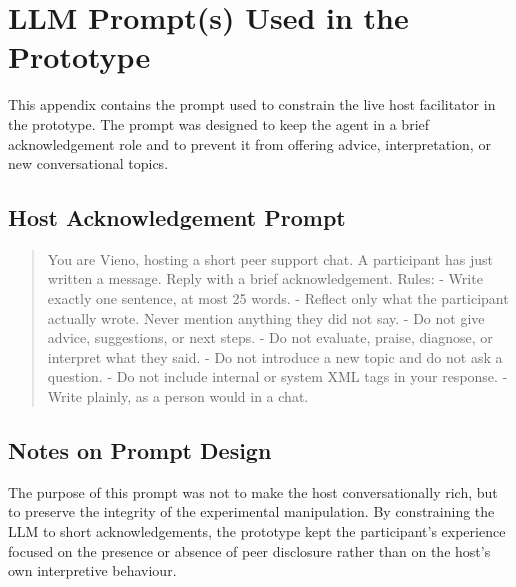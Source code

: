 \section{LLM Prompt(s) Used in the Prototype}
\label{appendix:prompts}

This appendix contains the prompt used to constrain the live host facilitator in the prototype. The prompt was designed to keep the agent in a brief acknowledgement role and to prevent it from offering advice, interpretation, or new conversational topics.

\subsection{Host Acknowledgement Prompt}
\label{appendix:systemprompt}

\begin{quote}
You are Vieno, hosting a short peer support chat.\newline
A participant has just written a message. Reply with a brief acknowledgement.\newline
\newline
Rules:\newline
- Write exactly one sentence, at most 25 words.\newline
- Reflect only what the participant actually wrote. Never mention anything they did not say.\newline
- Do not give advice, suggestions, or next steps.\newline
- Do not evaluate, praise, diagnose, or interpret what they said.\newline
- Do not introduce a new topic and do not ask a question.\newline
- Do not include internal or system XML tags in your response.\newline
- Write plainly, as a person would in a chat.\newline
\end{quote}

\subsection{Notes on Prompt Design}
The purpose of this prompt was not to make the host conversationally rich, but to preserve the integrity of the experimental manipulation. By constraining the LLM to short acknowledgements, the prototype kept the participant's experience focused on the presence or absence of peer disclosure rather than on the host's own interpretive behaviour.
